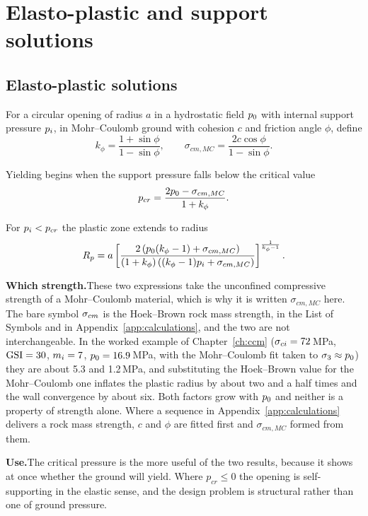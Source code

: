 \section{Elasto-plastic and support solutions}
\label{sec:elasto-plastic-and-support-solutions}

\subsection{Elasto-plastic solutions}
\label{sec:elasto-plastic-appendix}

For a circular opening of radius $a$ in a hydrostatic field $p_0$ with
internal support pressure $p_i$, in Mohr--Coulomb ground with cohesion $c$
and friction angle $\phi$, define
\[
k_\phi = \frac{1+\sin\phi}{1-\sin\phi},
\qquad
\sigma_{cm,MC} = \frac{2c\cos\phi}{1-\sin\phi}.
\]

Yielding begins when the support pressure falls below the critical value
\[
p_{cr} = \frac{2p_0 - \sigma_{cm,MC}}{1 + k_\phi}.
\]

For $p_i < p_{cr}$ the plastic zone extends to radius
\[
R_p = a\left[\frac{2\left(p_0(k_\phi-1) + \sigma_{cm,MC}\right)}
{(1+k_\phi)\left((k_\phi-1)p_i + \sigma_{cm,MC}\right)}\right]^{\frac{1}{k_\phi-1}} .
\]

\noindent\textbf{Which strength.}\enspace These two expressions take the
unconfined compressive strength of a Mohr--Coulomb material, which is why it is
written $\sigma_{cm,MC}$ here. The bare symbol $\sigma_{cm}$ is the Hoek--Brown rock
mass strength, in the List of Symbols and in
Appendix~\ref{app:calculations}, and the two are not interchangeable. In the
worked example of Chapter~\ref{ch:ccm} ($\sigma_{ci} = 72$\,MPa, $\mathrm{GSI} = 30$,
$m_i = 7$, $p_0 = 16.9$\,MPa, with the Mohr--Coulomb fit taken to
$\sigma_3 \approx p_0$) they are about 5.3 and 1.2\,MPa, and substituting
the Hoek--Brown value for the Mohr--Coulomb one inflates the plastic radius by
about two and a half times and the wall convergence by about six. Both factors
grow with $p_0$ and neither is a property of strength alone. Where a
sequence in Appendix~\ref{app:calculations} delivers a rock mass strength, $c$
and $\phi$ are fitted first and $\sigma_{cm,MC}$ formed from them.

\noindent\textbf{Use.}\enspace The critical pressure is the more useful of the
two results, because it shows at once whether the ground will yield.
Where $p_{cr} \leq 0$ the opening is self-supporting in the
elastic sense, and the design problem is structural rather than one of ground
pressure.

